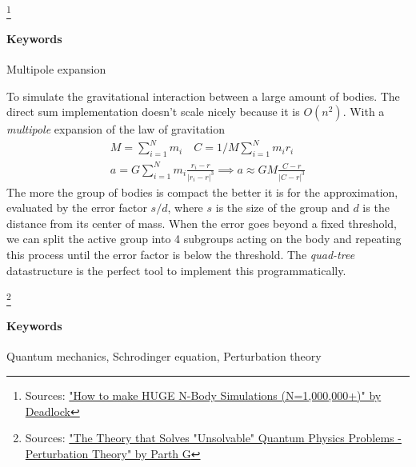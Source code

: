 \footnote{Sources: \href{https://youtu.be/nZHjD3cI-EU?si=MFS3zFu0WUgWJujP}{"How to make HUGE N-Body Simulations (N=1,000,000+)" by Deadlock}}

\paragraph{\textbf{Keywords}} Multipole expansion

\begin{multicols}{3}
  To simulate the gravitational interaction between a large amount of bodies.
  The direct sum implementation doesn't scale nicely because it is $O(n^2)$.
  With a \textit{multipole} expansion of the law of gravitation
  \begin{equation*}
    \begin{gathered}
      M = \sum_{i=1} ^N m_i \quad
      C = 1/M \sum_{i=1} ^N m_i r_i \\
      a = G \sum_{i=1}^N m_i \frac{r_i - r}{|r_i - r|^3} \implies a \approx GM \frac{C - r}{|C - r|^3}
    \end{gathered}
  \end{equation*}
  The more the group of bodies is compact the better it is for the approximation, evaluated by the error factor $s/d$,
  where $s$ is the size of the group and $d$ is the distance from its center of mass. When the error goes beyond a fixed threshold,
  we can split the active group into 4 subgroups acting on the body and repeating this process until the error factor is below the
  threshold. The \textit{quad-tree} datastructure is the perfect tool to implement this programmatically.
\end{multicols}


\footnote{Sources:
  \href{https://youtu.be/j0zghSW6loQ?si=wMq23Hep2WyrlTQQ}
  {"The Theory that Solves "Unsolvable" Quantum Physics Problems - Perturbation Theory" by Parth G}}

\paragraph{\textbf{Keywords}} Quantum mechanics, Schrodinger equation, Perturbation theory

